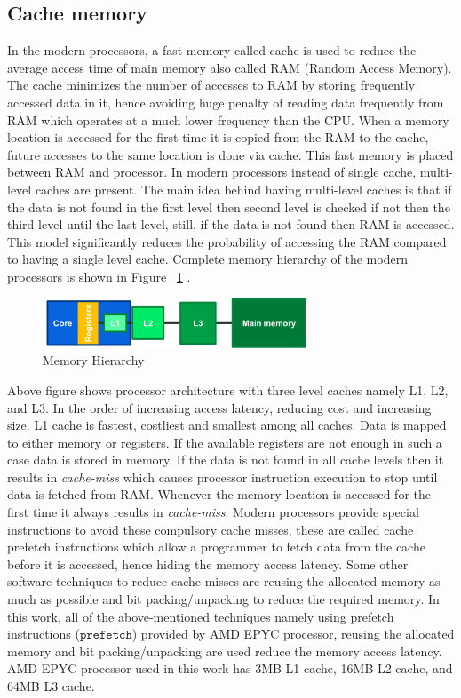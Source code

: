 \subsection{Cache memory} \label{cacheSection}
In the modern processors, a fast memory called cache is used to reduce the average access time of main memory also called RAM (Random Access Memory). The cache minimizes the number of accesses to RAM by storing frequently accessed data in it, hence avoiding huge penalty of reading data frequently from RAM which operates at a much lower frequency than the CPU. When a memory location is accessed for the first time it is copied from the RAM to the cache, future accesses to the same location is done via cache. This fast memory is placed between RAM and processor. In modern processors instead of single cache, multi-level caches are present. The main idea behind having multi-level caches is that if the data is not found in the first level then second level is checked if not then the third level until the last level, still, if the data is not found then RAM is accessed. This model significantly reduces the probability of accessing the RAM compared to having a single level cache. Complete memory hierarchy of the modern processors is shown in Figure  ~\ref{fig:memoryHierarchy} \cite{CMP}.

\begin{figure}[h]
	\centering
	\includegraphics[width=0.7\textwidth]{./figures/memoryHierarchy.pdf}
	\caption{Memory Hierarchy}
	\label{fig:memoryHierarchy}
\end{figure}

Above figure shows processor architecture with three level caches namely L1, L2, and L3. In the order of increasing access latency, reducing cost and increasing size. L1 cache is fastest, costliest and smallest among all caches. Data is mapped to either memory or registers. If the available registers are not enough in such a case data is stored in memory. If the data is not found in all cache levels then it results in \emph{cache-miss} which causes processor instruction execution to stop until data is fetched from RAM. Whenever the memory location is accessed for the first time it always results in \emph{cache-miss}. Modern processors provide special instructions to avoid these compulsory cache misses, these are called cache prefetch instructions which allow a programmer to fetch data from the cache before it is accessed, hence hiding the memory access latency. Some other software techniques to reduce cache misses are reusing the allocated memory as much as possible and bit packing/unpacking to reduce the required memory. In this work, all of the above-mentioned techniques namely using prefetch instructions ($\mathtt{prefetch}$) provided by AMD EPYC processor, reusing the allocated memory and bit packing/unpacking are used reduce the memory access latency. AMD EPYC processor used in this work has 3MB L1 cache, 16MB L2 cache, and 64MB L3 cache.

